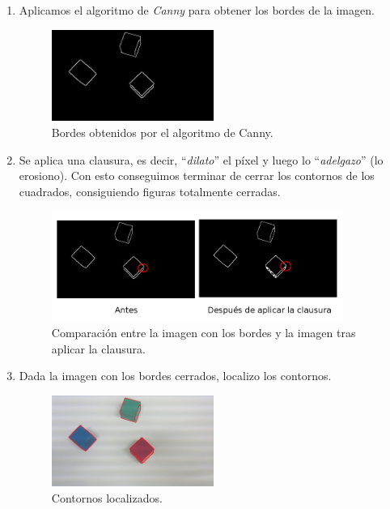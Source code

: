 \documentclass[11pt]{article}
\begin{document}
\begin{enumerate}
\item Aplicamos el algoritmo de \textit{Canny} para obtener los bordes de la imagen.
\begin{figure}[h!]
  \centering
      \includegraphics[width=0.5\textwidth]{img3}
  \caption{Bordes obtenidos por el algoritmo de Canny.}
\end{figure}

\item Se aplica una clausura, es decir, ``\textit{dilato}'' el píxel y luego lo ``\textit{adelgazo}'' (lo erosiono). Con esto conseguimos terminar de cerrar los contornos de los cuadrados, consiguiendo figuras totalmente cerradas.
\begin{figure}[h!]
  \centering
      \includegraphics[width=0.9\textwidth]{img4}
  \caption{Comparación entre la imagen con los bordes y la imagen tras aplicar la clausura.}
\end{figure}

\item Dada la imagen con los bordes cerrados, localizo los contornos.
\begin{figure}[h!]
  \centering
      \includegraphics[width=0.5\textwidth]{img5}
  \caption{Contornos localizados.}
\end{figure}


\end{enumerate}
\end{document}
